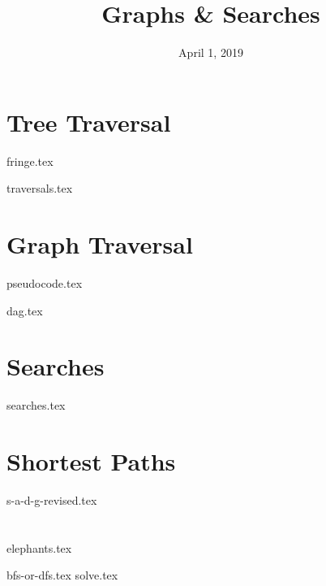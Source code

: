\documentclass[11pt]{exam}
\title{Graphs \& Searches}
\date{April 1, 2019}
\begin{document}
\maketitle

\section{Tree Traversal}
{fringe.tex}
\begin{questions}
{traversals.tex}
\end{questions}

\section{Graph Traversal}
{pseudocode.tex}
\begin{questions}
{dag.tex}
\end{questions}

\clearpage

\section{Searches}
\begin{questions}
{searches.tex}
\end{questions}

\section{Shortest Paths}
\begin{questions}
{s-a-d-g-revised.tex}
\end{questions}

\clearpage

\section{}
{elephants.tex}
\begin{questions}
{bfs-or-dfs.tex}
{solve.tex}
\end{questions}
\end{document}

